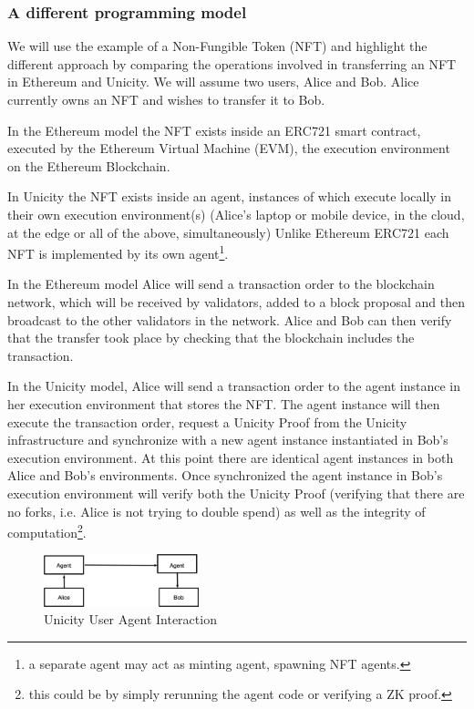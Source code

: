 \documentclass{article}
\begin{document}
\subsubsection{A different programming model}

We will use the example of a Non-Fungible Token (NFT) and highlight the different approach by comparing the operations involved in transferring an NFT in Ethereum and Unicity.  We will assume two users, Alice and Bob. Alice currently owns an NFT and wishes to transfer it to Bob.

In the Ethereum model the NFT exists inside an ERC721 smart contract, executed by the Ethereum Virtual Machine (EVM), the execution environment on the Ethereum Blockchain.



In Unicity the NFT exists inside an agent, instances of which execute locally in their own execution environment(s) (Alice's laptop or mobile device, in the cloud, at the edge or all of the above, simultaneously) Unlike Ethereum ERC721 each NFT is implemented by its own agent\footnote{a separate agent may act as minting agent, spawning NFT agents.}.


In the Ethereum model Alice will send a transaction order to the blockchain network, which will be received by validators, added to a block proposal and then broadcast to the other validators in the network. Alice and Bob can then verify that the transfer took place by checking that the blockchain includes the transaction.


In the Unicity model, Alice will send a transaction order to the agent instance in her execution environment that stores the NFT. The agent instance will then execute the transaction order, request a Unicity Proof from the Unicity infrastructure and synchronize with a new agent instance instantiated in Bob's execution environment. At this point there are identical agent instances in both Alice and Bob's environments. Once synchronized the agent instance in Bob's execution environment will verify both the Unicity Proof (verifying that there are no forks, i.e. Alice is not trying to double spend) as well as the integrity of computation\footnote{this could be by simply rerunning the agent code or verifying a ZK proof.}.

\begin{figure}[htbp]
    \centering
    \includegraphics[width=0.4\textwidth]{UserAgent.png}
    \caption{Unicity User Agent Interaction}
    \label{fig:UserAgent}
\end{figure}
\end{document}
